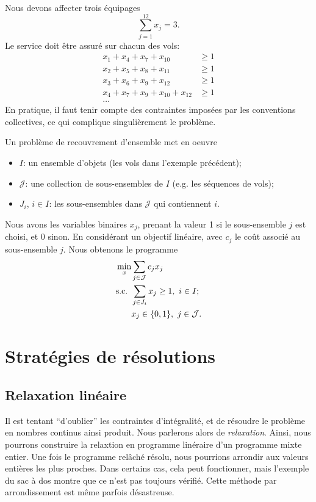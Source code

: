 \begin{example}
\[\]
Nous devons affecter trois équipages
\[
\sum_{j=1}^{12} x_j = 3.
\]
Le service doit être assuré sur chacun des vols:
\begin{align*}
x_1 + x_4 + x_7 + x_{10} & \geq 1 \\
x_2 + x_5 + x_8 + x_{11} & \geq 1 \\
x_3 + x_6 + x_9 + x_{12} & \geq 1 \\
x_4 + x_7 + x_9 + x_{10} + x_{12} & \geq 1 \\
\ldots
\end{align*}
En pratique, il faut tenir compte des contraintes imposées par les conventions collectives, ce qui complique singulièrement le problème.
\end{example}

Un problème de recouvrement d'ensemble met en oeuvre
\begin{itemize}
\item
$I$: un ensemble d'objets (les vols dans l'exemple précédent);
\item
$\mathcal{J}$: une collection de sous-ensembles de $I$ (e.g. les séquences de vols);
\item
$J_i$, $i \in I$: les sous-ensembles dans $\mathcal{J}$ qui contiennent $i$.
\end{itemize}
Nous avons les variables binaires $x_j$, prenant la valeur 1 si le sous-ensemble $j$ est choisi, et 0 sinon.
En considérant un objectif linéaire, avec $c_j$ le coût associé au sous-ensemble $j$.
Nous obtenons le programme
\begin{align*}
\min_x & \sum_{j \in \mathcal{J}} c_jx_j \\
\mbox{s.c. } & \sum_{j \in J_i} x_j \geq 1,\ i \in I;\\
& x_j \in \lbrace 0, 1\rbrace,\ j \in \mathcal{J}.
\end{align*}

\section{Stratégies de résolutions}

\subsection{Relaxation linéaire}

Il est tentant ``d'oublier'' les contraintes d'intégralité, et de résoudre le problème en nombres continus ainsi produit.
Nous parlerons alors de {\sl relaxation}.
Ainsi, nous pourrons construire la relaxtion en programme linéraire d'un programme mixte entier.
Une fois le programme relâché résolu, nous pourrions arrondir aux valeurs entières les plus proches.
Dans certains cas, cela peut fonctionner, mais l'exemple du sac à dos montre que ce n'est pas toujours vérifié.
Cette méthode par arrondissement est même parfois désastreuse.

